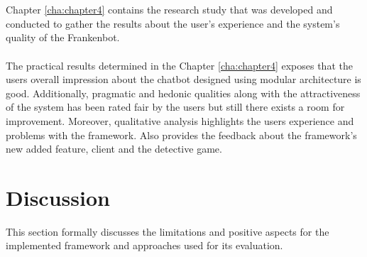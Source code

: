 \\~\\
Chapter \ref{cha:chapter4} contains the research study that was developed and conducted to gather the results about the user's experience and the system's quality of the Frankenbot.
\\~\\
The practical results determined in the Chapter \ref{cha:chapter4} exposes that the users overall impression about the chatbot designed using modular architecture is good. Additionally, pragmatic and hedonic qualities along with the attractiveness of the system has been rated fair by the users but still there exists a room for improvement. Moreover, qualitative analysis highlights the users experience and problems with the framework. Also provides the feedback about the framework's new added feature, client and the detective game.

\section{Discussion\label{sec:discussion}}
This section formally discusses the limitations and positive aspects for the implemented framework and approaches used for its evaluation. 


